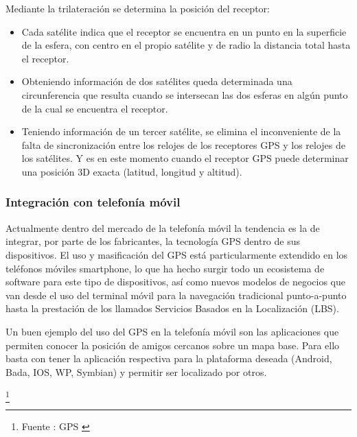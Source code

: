 Mediante la trilateración se determina la posición del receptor:
\begin{itemize}

\item Cada satélite indica que el receptor se encuentra en un punto en la superficie de la esfera, con centro en el propio satélite y de radio la distancia total hasta el receptor.
\item Obteniendo información de dos satélites queda determinada una circunferencia que resulta cuando se intersecan las dos esferas en algún punto de la cual se encuentra el receptor.
\item Teniendo información de un tercer satélite, se elimina el inconveniente de la falta de sincronización entre los relojes de los receptores GPS y los relojes de los satélites. Y es en este momento cuando el receptor GPS puede determinar una posición 3D exacta (latitud, longitud y altitud).
\end{itemize}
\subsubsection{Integración con telefonía móvil}
Actualmente dentro del mercado de la telefonía móvil la tendencia es la de integrar, por parte de los fabricantes, la tecnología GPS dentro de sus dispositivos. El uso y masificación del GPS está particularmente extendido en los teléfonos móviles smartphone, lo que ha hecho surgir todo un ecosistema de software para este tipo de dispositivos, así como nuevos modelos de negocios que van desde el uso del terminal móvil para la navegación tradicional punto-a-punto hasta la prestación de los llamados Servicios Basados en la Localización (LBS).

Un buen ejemplo del uso del GPS en la telefonía móvil son las aplicaciones que permiten conocer la posición de amigos cercanos sobre un mapa base. Para ello basta con tener la aplicación respectiva para la plataforma deseada (Android, Bada, IOS, WP, Symbian) y permitir ser localizado por otros.

\footnote{Fuente : GPS \cite{GPS}}